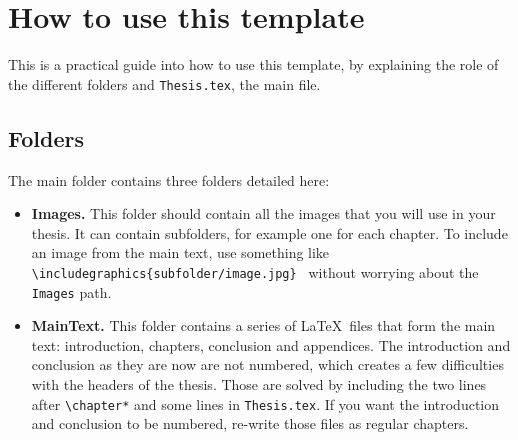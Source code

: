 \chapter{How to use this template} \label{ch-2}

This is a practical guide into how to use this template, by explaining the role of the different folders and \texttt{Thesis.tex}, the main file.

\section{Folders}

The main folder contains three folders detailed here:

\begin{itemize}

\item \textbf{Images.} This folder should contain all the images that you will use in your thesis. It can contain subfolders, for example one for each chapter. To include an image from the main text, use something like \texttt{\textbackslash includegraphics\{subfolder/image.jpg\} } without worrying about the \texttt{Images} path.

\item \textbf{MainText.} This folder contains a series of \LaTeX\ files that form the main text: introduction, chapters, conclusion and appendices. The introduction and conclusion as they are now are not numbered, which creates a few difficulties with the headers of the thesis. Those are solved by including the two lines after \texttt{\textbackslash chapter*} and some lines in \texttt{Thesis.tex}. If you want the introduction and conclusion to be numbered, re-write those files as regular chapters.  


\end{itemize}
